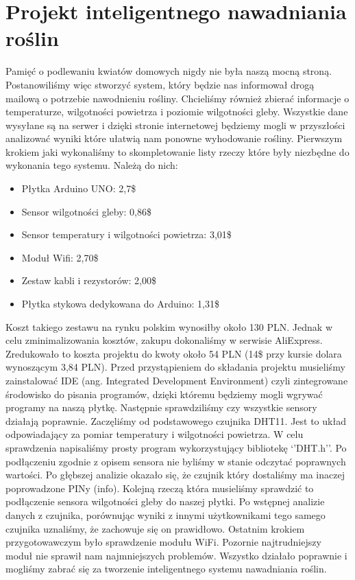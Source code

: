\documentclass[brudnopis]{xmgr}
\begin{document}
\section{Projekt inteligentnego nawadniania roślin}
	Pamięć o podlewaniu kwiatów domowych nigdy nie była naszą mocną stroną. Postanowiliśmy więc stworzyć system, który będzie nas informował drogą mailową o potrzebie nawodnieniu rośliny. Chcieliśmy również zbierać informacje o temperaturze, wilgotności powietrza i poziomie wilgotności gleby. Wszystkie dane wysyłane są na serwer i dzięki stronie internetowej będziemy mogli w przyszłości analizować wyniki które ułatwią nam ponowne wyhodowanie rośliny. 
	Pierwszym krokiem jaki wykonaliśmy to skompletowanie listy rzeczy które były niezbędne do wykonania tego systemu. Należą do nich: 
\begin{itemize}
\item Płytka Arduino UNO: 2,7\$
\item Sensor wilgotności gleby: 0,86\$
\item Sensor temperatury i wilgotności powietrza: 3,01\$
\item Moduł Wifi: 2,70\$
\item Zestaw kabli i rezystorów: 2,00\$
\item Płytka stykowa dedykowana do Arduino: 1,31\$
\end{itemize}
Koszt takiego zestawu na rynku polskim wynosiłby około 130 PLN. Jednak w celu zminimalizowania kosztów, zakupu dokonaliśmy w serwisie AliExpress. Zredukowało to koszta  projektu do kwoty około 54 PLN (14\$ przy kursie dolara wynoszącym 3,84 PLN).
	Przed przystąpieniem do składania projektu musieliśmy zainstalować IDE (ang. Integrated Development Environment) czyli zintegrowane środowisko do pisania programów, dzięki któremu będziemy mogli wgrywać programy na naszą płytkę. Następnie sprawdziliśmy czy wszystkie sensory działają poprawnie. Zaczęliśmy od podstawowego czujnika DHT11. Jest to układ odpowiadający za pomiar temperatury i wilgotności powietrza. W celu sprawdzenia napisaliśmy prosty program wykorzystujący bibliotekę ‘’DHT.h’’. Po podłączeniu zgodnie z opisem sensora nie byliśmy w stanie odczytać poprawnych wartości. Po głębszej analizie okazało się, że czujnik który dostaliśmy ma inaczej poprowadzone PINy (info). Kolejną rzeczą która musieliśmy sprawdzić to podłączenie sensora wilgotności gleby do naszej płytki. Po wstępnej analizie danych z czujnika, porównując wyniki z innymi użytkownikami tego samego czujnika uznaliśmy, że zachowuje się on prawidłowo. Ostatnim krokiem przygotowawczym było sprawdzenie modułu WiFi. Pozornie najtrudniejszy moduł nie sprawił nam najmniejszych problemów. Wszystko działało poprawnie i mogliśmy zabrać się za tworzenie inteligentnego systemu nawadniania roślin.
\end{document}

